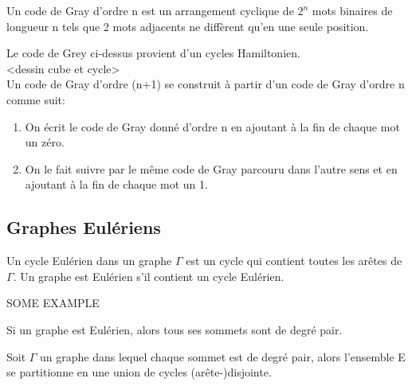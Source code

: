 Un code de Gray d'ordre n est un arrangement cyclique de $2^{n}$ mots binaires de longueur n tels que 2 mots adjacents ne diffèrent qu'en une seule position.\\

\begin{exmp}
\end{exmp}




Le code de Grey ci-dessus provient d'un cycles Hamiltonien.\\

<dessin cube et cycle>\\

Un code de Gray d'ordre (n+1) se construit à partir d'un code de Gray d'ordre n comme suit:

\begin{enumerate}
	\item On écrit le code de Gray donné d'ordre n en ajoutant à la fin de chaque mot un zéro.
	\item On le fait suivre par le même code de Gray parcouru dans l'autre sens et en ajoutant à la fin de chaque mot un 1.
\end{enumerate}


\subsection{Graphes Eulériens}

\begin{defn}
Un cycle Eulérien dans un graphe $\Gamma$ est un cycle qui contient toutes les arêtes de $\Gamma$.
Un graphe est Eulérien s'il contient un cycle Eulérien.\\
\end{defn}

\begin{exmp}
SOME EXAMPLE\\
\end{exmp}

\begin{prop}
Si un graphe est Eulérien, alors tous ses sommets sont de degré pair.\\
\end{prop}

\begin{lemme}
Soit $\Gamma$ un graphe dans lequel chaque sommet est de degré pair, alors l'ensemble E se partitionne en une union de cycles (arête-)disjointe.\\
\end{lemme}

